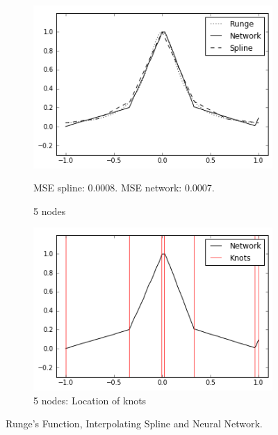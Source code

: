 \documentclass[11pt, letterpaper]{amsart}
\begin{document}
\begin{figure}[H]
    \begin{subfigure}{.45\textwidth}
        \includegraphics[width=\textwidth]{5nodes1.png}
        \caption{5 nodes}
            \begin{tablenotes}
                 \tiny
            	\item  MSE spline: 0.0008. MSE network: 0.0007.
        	\end{tablenotes}
    \end{subfigure}
    \quad
    \begin{subfigure}{.45\textwidth}
        \includegraphics[width=\textwidth]{5nodes2.png}
        \caption{5 nodes: Location of knots}
    \end{subfigure}
\caption{Runge's Function, Interpolating Spline and Neural Network.}
\end{figure}
\end{document}
